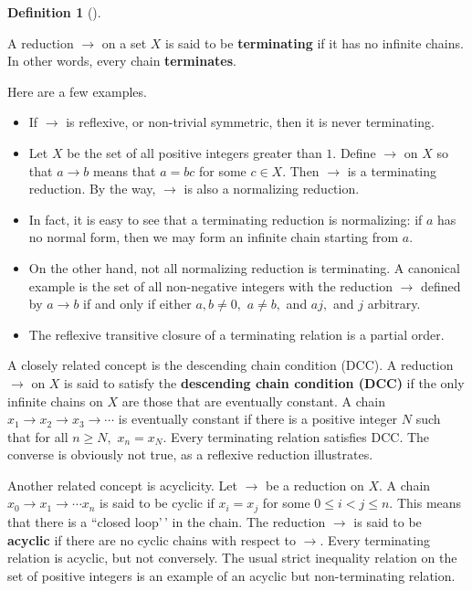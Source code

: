 \documentclass[
  letterpaper,
  10pt,
  reqno,
  twopage,
  openany]{book}
\providecommand{\tightlist}{%
  \setlength{\itemsep}{0pt}\setlength{\parskip}{0pt}}\usepackage{longtable,booktabs,array}
\theoremstyle{plain}
\theoremstyle{definition}
\theoremstyle{definition}
\newtheorem{definition}{Definition}[chapter]
\theoremstyle{definition}
\theoremstyle{plain}
\theoremstyle{plain}
\theoremstyle{remark}
\begin{document}
\leavevmode{}%
\begin{definition}[]\label{def-terminating}

A reduction \(\to\) on a set \(X\) is said to be 
\textbf{terminating} if it has no infinite chains. In other words, every
chain \textbf{terminates}.

\end{definition}

Here are a few examples.

\begin{itemize}
\tightlist
\item
  If \(\to\) is reflexive, or non-trivial symmetric, then it is never
  terminating.
\item
  Let \(X\) be the set of all positive integers greater than \(1.\)
  Define \(\to\) on \(X\) so that \(a\to b\) means that \(a=bc\) for
  some \(c\in X.\) Then \(\to\) is a terminating reduction. By the way,
  \(\to\) is also a normalizing reduction.
\item
  In fact, it is easy to see that a terminating reduction is
  normalizing: if \(a\) has no normal form, then we may form an infinite
  chain starting from \(a.\)
\item
  On the other hand, not all normalizing reduction is terminating. A
  canonical example is the set of all non-negative integers with the
  reduction \(\to\) defined by \(a\to b\) if and only if either
  \(a,b\ne 0,\) \(a\ne b,\) and \(aj,\) and \(j\) arbitrary.
\item
  The reflexive transitive closure of a terminating relation is a
  partial order.
\end{itemize}

A closely related concept is the descending chain condition (DCC). A
reduction \(\to\) on \(X\) is said to satisfy the
 \textbf{descending chain
condition (DCC)} if the only infinite chains on \(X\) are those that are
eventually constant. A chain \(x_1\to x_2 \to x_3 \to \cdots\) is
eventually constant if there is a positive integer \(N\) such that for
all \(n\ge N,\) \(x_n=x_N.\) Every terminating relation satisfies DCC.
The converse is obviously not true, as a reflexive reduction
illustrates.

Another related concept is acyclicity. Let \(\to\) be a reduction on
\(X.\) A chain \(x_0\to x_1 \to \cdots x_n\) is said to be cyclic if
\(x_i=x_j\) for some \(0\le i < j\le n.\) This means that there is a
``closed loop'\,' in the chain. The reduction \(\to\) is said to be
 \textbf{acyclic} if there are no cyclic chains with
respect to \(\to.\) Every terminating relation is acyclic, but not
conversely. The usual strict inequality relation on the set of positive
integers is an example of an acyclic but non-terminating relation.
\end{document}
